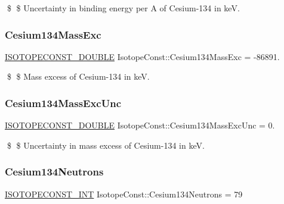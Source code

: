 \$ \$ Uncertainty in binding energy per A of Cesium-\/134 in keV. \mbox{\label{group___isotope_const-_cesium-_cs134_ga63ff1f35519ee01f5b2b18b9ed2eb9fd}} 
\subsubsection{\texorpdfstring{Cesium134\+Mass\+Exc}{Cesium134MassExc}}
{\footnotesize\ttfamily \mbox{\hyperlink{group___isotope_const-_macros_ga8f45a7272ce02c0b4c65c44636ed719a}{I\+S\+O\+T\+O\+P\+E\+C\+O\+N\+S\+T\+\_\+\+D\+O\+U\+B\+LE}} Isotope\+Const\+::\+Cesium134\+Mass\+Exc = -\/86891.}

\$ \$ Mass excess of Cesium-\/134 in keV. \mbox{\label{group___isotope_const-_cesium-_cs134_ga35d1ebef00d0b43fac9aafa601194659}} 
\subsubsection{\texorpdfstring{Cesium134\+Mass\+Exc\+Unc}{Cesium134MassExcUnc}}
{\footnotesize\ttfamily \mbox{\hyperlink{group___isotope_const-_macros_ga8f45a7272ce02c0b4c65c44636ed719a}{I\+S\+O\+T\+O\+P\+E\+C\+O\+N\+S\+T\+\_\+\+D\+O\+U\+B\+LE}} Isotope\+Const\+::\+Cesium134\+Mass\+Exc\+Unc = 0.}

\$ \$ Uncertainty in mass excess of Cesium-\/134 in keV. \mbox{\label{group___isotope_const-_cesium-_cs134_gae3ab79e8625c3c9ac06b12de8f676618}} 
\subsubsection{\texorpdfstring{Cesium134\+Neutrons}{Cesium134Neutrons}}
{\footnotesize\ttfamily \mbox{\hyperlink{group___isotope_const-_macros_ga5f18360b3e99483a35c32d789e62621c}{I\+S\+O\+T\+O\+P\+E\+C\+O\+N\+S\+T\+\_\+\+I\+NT}} Isotope\+Const\+::\+Cesium134\+Neutrons = 79}

